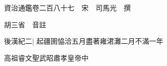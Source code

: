 






























































資治通鑑卷二百八十七　宋　司馬光　撰

胡三省　音註

後漢紀二|{
	起疆圉恊洽五月盡著雍涒灘二月不滿一年}


高祖睿文聖武昭肅孝皇帝中

